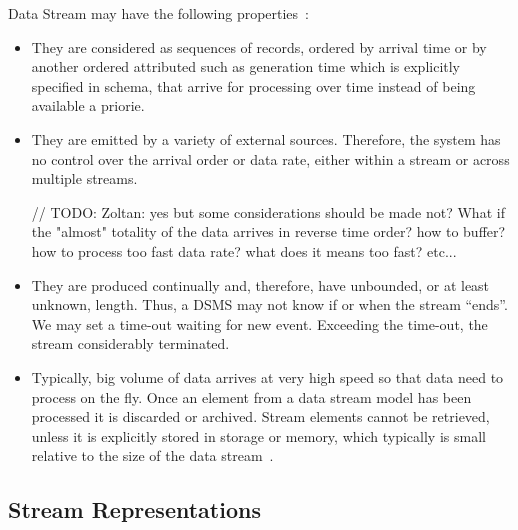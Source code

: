 Data Stream may have the following properties~\citep{Golab:2010}:
\begin{itemize}
	\item They are considered as sequences of records, ordered by arrival time or by another ordered attributed such as generation time which is explicitly specified in schema, that arrive for processing over time instead of being available a priorie.
	
	\item They are emitted by a variety of external sources. Therefore, the system has no control over the arrival order or data rate, either within a stream or across multiple streams.
	
	// TODO: Zoltan: yes but some considerations should be made not?
What if the "almost" totality of the data arrives in reverse time order? how to buffer? how to process too fast data rate?
what does it means too fast?
etc...

	\item They are produced continually and, therefore, have unbounded, or at least unknown, length. Thus, a DSMS may not know if or when the stream ``ends''. We may set a time-out waiting for new event. Exceeding the time-out, the stream considerably terminated. 
	
	\item Typically, big volume of data arrives at very high speed so that data need to process on the fly. Once an element from a data stream model has been processed it is discarded or archived. Stream elements cannot be retrieved, unless it is explicitly stored in storage or memory, which typically is small relative to the size of the data stream~\citep{Babcock:2002}.
	
\end{itemize}


\subsection*{Stream Representations}
